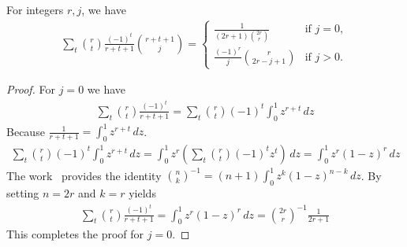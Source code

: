 \begin{lemma}
    \label{lem:altering-binomial-identity}
    For integers $r, j$, we have
    \begin{align*}
        \sum_{t} \binom{r}{t} \frac{(-1)^t}{r+t+1} \binom{r+t+1}{j}
        = \begin{cases}
              \displaystyle \frac{1}{(2r+1) \binom{2r}{r}} & \text{if } j=0, \\[0.8em]
              \displaystyle \frac{(-1)^r}{j} \binom{r}{2r-j+1} & \text{if } j>0.
        \end{cases}
    \end{align*}
    \begin{proof}
        For $j=0$ we have
        \begin{align*}
            \sum_t \binom{r}{t} \frac{(-1)^t}{r+t+1} = \sum_t \binom{r}{t} (-1)^t \int_0^1 z^{r+t} \, dz
        \end{align*}
        Because $\frac{1}{r+t+1} = \int_0^1 z^{r+t} \, dz$.
        \begin{align*}
            \sum_t \binom{r}{t} (-1)^t \int_0^1 z^{r+t} \, dz
            = \int_0^1 z^r \left( \sum_t \binom{r}{t} (-1)^t z^{t} \right) \, dz
            = \int_0^1 z^r (1 - z)^r \, dz
        \end{align*}
        The work~\cite{sury2004identities} provides the identity $\binom{n}{k}^{-1}=(n+1)\int_0^1 z^k(1-z)^{n-k}\,dz$.
        By setting $n=2r$ and $k=r$ yields
        \begin{align*}
            \sum_t \binom{r}{t} \frac{(-1)^t}{r+t+1} = \int_0^1 z^r (1-z)^{r}\,dz = \binom{2r}{r}^{-1} \frac{1}{2r+1}
        \end{align*}
        This completes the proof for $j=0$.


\end{proof}
\end{lemma}
